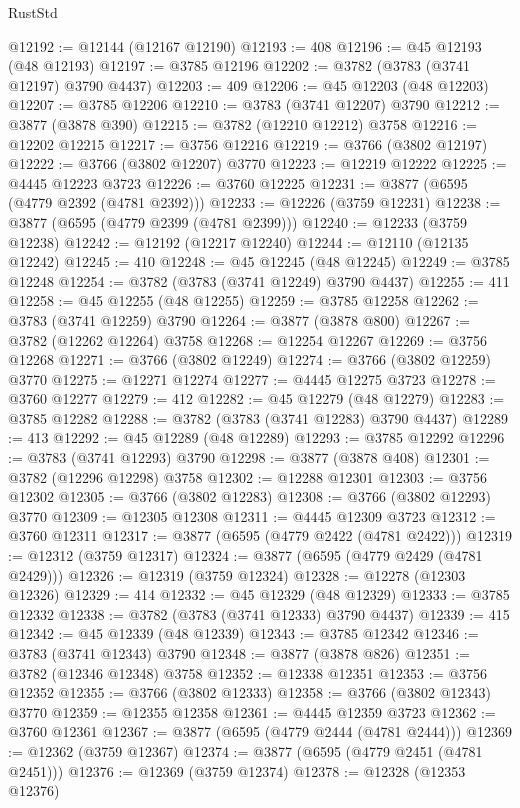 \begin{lexlean}{RustStd}
\begin{coremodule}
@12192 := @12144 (@12167 @12190)
@12193 := 408
@12196 := @45 @12193 (@48 @12193)
@12197 := @3785 @12196
@12202 := @3782 (@3783 (@3741 @12197) @3790 @4437)
@12203 := 409
@12206 := @45 @12203 (@48 @12203)
@12207 := @3785 @12206
@12210 := @3783 (@3741 @12207) @3790
@12212 := @3877 (@3878 @390)
@12215 := @3782 (@12210 @12212) @3758
@12216 := @12202 @12215
@12217 := @3756 @12216
@12219 := @3766 (@3802 @12197)
@12222 := @3766 (@3802 @12207) @3770
@12223 := @12219 @12222
@12225 := @4445 @12223 @3723
@12226 := @3760 @12225
@12231 := @3877 (@6595 (@4779 @2392 (@4781 @2392)))
@12233 := @12226 (@3759 @12231)
@12238 := @3877 (@6595 (@4779 @2399 (@4781 @2399)))
@12240 := @12233 (@3759 @12238)
@12242 := @12192 (@12217 @12240)
@12244 := @12110 (@12135 @12242)
@12245 := 410
@12248 := @45 @12245 (@48 @12245)
@12249 := @3785 @12248
@12254 := @3782 (@3783 (@3741 @12249) @3790 @4437)
@12255 := 411
@12258 := @45 @12255 (@48 @12255)
@12259 := @3785 @12258
@12262 := @3783 (@3741 @12259) @3790
@12264 := @3877 (@3878 @800)
@12267 := @3782 (@12262 @12264) @3758
@12268 := @12254 @12267
@12269 := @3756 @12268
@12271 := @3766 (@3802 @12249)
@12274 := @3766 (@3802 @12259) @3770
@12275 := @12271 @12274
@12277 := @4445 @12275 @3723
@12278 := @3760 @12277
@12279 := 412
@12282 := @45 @12279 (@48 @12279)
@12283 := @3785 @12282
@12288 := @3782 (@3783 (@3741 @12283) @3790 @4437)
@12289 := 413
@12292 := @45 @12289 (@48 @12289)
@12293 := @3785 @12292
@12296 := @3783 (@3741 @12293) @3790
@12298 := @3877 (@3878 @408)
@12301 := @3782 (@12296 @12298) @3758
@12302 := @12288 @12301
@12303 := @3756 @12302
@12305 := @3766 (@3802 @12283)
@12308 := @3766 (@3802 @12293) @3770
@12309 := @12305 @12308
@12311 := @4445 @12309 @3723
@12312 := @3760 @12311
@12317 := @3877 (@6595 (@4779 @2422 (@4781 @2422)))
@12319 := @12312 (@3759 @12317)
@12324 := @3877 (@6595 (@4779 @2429 (@4781 @2429)))
@12326 := @12319 (@3759 @12324)
@12328 := @12278 (@12303 @12326)
@12329 := 414
@12332 := @45 @12329 (@48 @12329)
@12333 := @3785 @12332
@12338 := @3782 (@3783 (@3741 @12333) @3790 @4437)
@12339 := 415
@12342 := @45 @12339 (@48 @12339)
@12343 := @3785 @12342
@12346 := @3783 (@3741 @12343) @3790
@12348 := @3877 (@3878 @826)
@12351 := @3782 (@12346 @12348) @3758
@12352 := @12338 @12351
@12353 := @3756 @12352
@12355 := @3766 (@3802 @12333)
@12358 := @3766 (@3802 @12343) @3770
@12359 := @12355 @12358
@12361 := @4445 @12359 @3723
@12362 := @3760 @12361
@12367 := @3877 (@6595 (@4779 @2444 (@4781 @2444)))
@12369 := @12362 (@3759 @12367)
@12374 := @3877 (@6595 (@4779 @2451 (@4781 @2451)))
@12376 := @12369 (@3759 @12374)
@12378 := @12328 (@12353 @12376)

\end{coremodule}
\end{lexlean}
